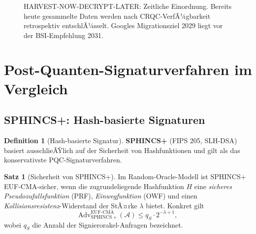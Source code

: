 ﻿\documentclass[a4paper,12pt]{article}
\theoremstyle{definition}
\newtheorem{definition}{Definition}[section]
\newtheorem{satz}{Satz}[section]
\begin{document}
\begin{figure}[H]
\centering
{}
\caption{HARVEST-NOW-DECRYPT-LATER: Zeitliche Einordnung. Bereits heute gesammelte Daten werden nach CRQC-VerfÃ¼gbarkeit retrospektiv entschlÃ¼sselt. Googles Migrationsziel 2029 liegt vor der BSI-Empfehlung 2031.}
\label{fig:hndl}
\end{figure}

\section{Post-Quanten-Signaturverfahren im Vergleich}

\subsection{SPHINCS+: Hash-basierte Signaturen}

\begin{definition}[Hash-basierte Signatur]
\textbf{SPHINCS+} \cite{HBD+22} (FIPS 205, SLH-DSA) basiert ausschlieÃŸlich
auf der Sicherheit von Hashfunktionen und gilt als das konservativste PQC-Signaturverfahren.
\end{definition}

\begin{satz}[Sicherheit von SPHINCS+]
Im Random-Oracle-Modell ist SPHINCS+ EUF-CMA-sicher, wenn die zugrundeliegende
Hashfunktion $H$ eine \emph{sicheres Pseudozufallsfunktion} (PRF),
\emph{Einwegfunktion} (OWF) und einen \emph{Kollisionsresistenz}-Widerstand
der StÃ¤rke $\lambda$ bietet. Konkret gilt
\[
  \mathrm{Adv}^{\mathrm{EUF\text{-}CMA}}_{\mathrm{SPHINCS+}}(\mathcal{A})
  \leq q_S \cdot 2^{-\lambda + 1},
\]
wobei $q_S$ die Anzahl der Signierorakel-Anfragen bezeichnet.
\end{satz}
\end{document}
